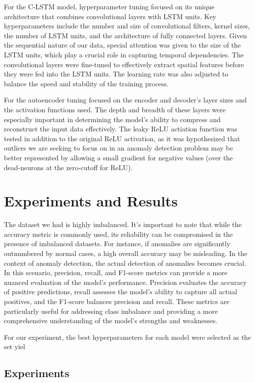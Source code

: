 \documentclass[10pt,twocolumn,letterpaper]{article}
\begin{document}
For the C-LSTM model, hyperparameter tuning focused on its unique architecture that combines convolutional layers with LSTM units. 
Key hyperparameters include the number and size of convolutional filters, kernel sizes, the number of LSTM units, and the architecture of fully connected layers. 
Given the sequential nature of our data, special attention was given to the size of the LSTM units, which play a crucial role in capturing temporal dependencies.
The convolutional layers were fine-tuned to effectively extract spatial features before they were fed into the LSTM units. The learning rate was also 
adjusted to balance the speed and stability of the training process.

For the autoencoder tuning focused on the encoder and decoder's layer sizes and the activation functions used. The depth and breadth of these layers were 
especially important in determining the model's ability to compress and reconstruct the input data effectively. The leaky ReLU actiation function was tested
in addition to the original ReLU activation, as it was hypothesized that outliers we are seeking to focus on in an anomaly detection problem may be better 
represented by allowing a small gradient for negative values (over the dead-neurons at the zero-cutoff for ReLU).


\section{Experiments and Results}
The dataset we had is highly imbalanced. It's important to note that while the accuracy metric is commonly used, its reliability can be 
compromised in the presence of imbalanced datasets. For instance, if anomalies are significantly outnumbered by normal cases, a high overall 
accuracy may be misleading. In the context of anomaly detection, the actual detection of anomalies becomes crucial.
In this scenario, precision, recall, and F1-score metrics can provide a more nuanced evaluation of the model's performance. 
Precision evaluates the accuracy of positive predictions, recall assesses the model's ability to capture all actual positives, and the F1-score 
balances precision and recall. These metrics are particularly useful for addressing class imbalance and providing a more comprehensive understanding of 
the model's strengths and weaknesses.

For our experiment, the best hyperparameters for each model were selected as the set yiel
\subsection{Experiments}
\end{document}
